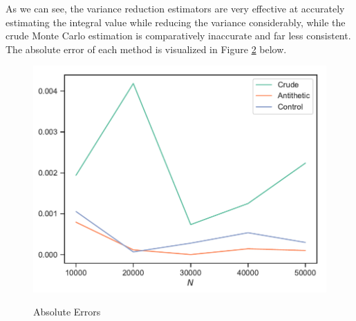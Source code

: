\documentclass[11pt, a4paper]{article}
\begin{document}
\begin{enumerate}
\begin{enumerate}
\begin{figure}[H]
                   \label{fig:mean}
                \end{figure}
                As we can see, the variance reduction estimators are very effective at accurately estimating the integral value while reducing the variance considerably,
                while the crude Monte Carlo estimation is comparatively inaccurate and far less consistent.
                The absolute error of each method is visualized in Figure \ref{fig:error} below.
                \begin{figure}[H]
                   \centering
                   \caption{Absolute Errors}
                   \includegraphics[scale=.93]{../figures/error.pdf}
                   \label{fig:error}
                \end{figure}
                \end{enumerate}
\end{enumerate}
\end{document}
